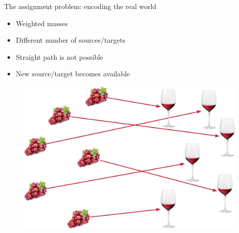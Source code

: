 \documentclass[pdf,aspectratio=169,10pt]{beamer}
\begin{document}
\begin{frame}{The assignment problem: encoding the real world}

\begin{minipage}{0.45\textwidth}
\begin{itemize}
    \item Weighted masses
    \item Different number of sources/targets
    \item Straight path is not possible
    \item New source/target becomes available
\end{itemize}
\vspace{2em}
\centerline{  }
\end{minipage}
\hfill
\begin{minipage}{0.5\textwidth}
 \begin{figure}
        \includegraphics[width=0.99\textwidth]{../img/wine_assignment.pdf}  
    \end{figure}
\end{minipage}

\end{frame}
\end{document}
